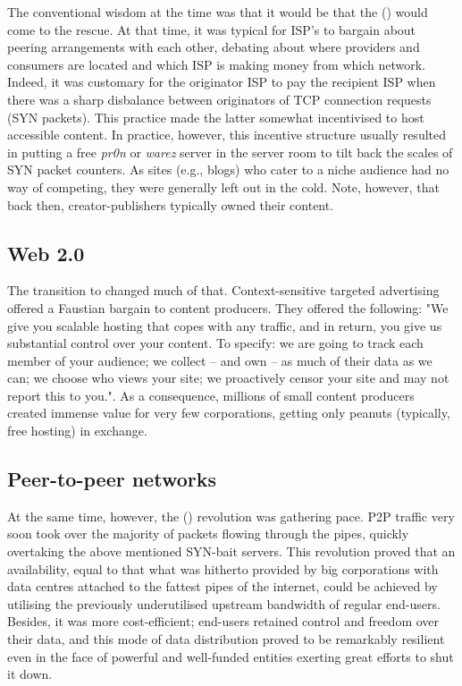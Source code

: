 The conventional wisdom at the time was that it would be that the  () would come to the rescue. At that time, it was typical for ISP's to bargain about peering arrangements with each other, debating about where providers and consumers are located and which ISP is making money from which network. Indeed, it was customary for the originator ISP to pay the recipient ISP when there was a sharp disbalance between originators of TCP connection requests (SYN packets). This practice made the latter somewhat incentivised to host accessible content. In practice, however, this incentive structure usually resulted in putting a free \emph{pr0n} or \emph{warez} server in the server room to tilt back the scales of SYN packet counters. As sites (e.g., blogs) who cater to a niche audience had no way of competing, they were generally left out in the cold. Note, however, that back then, creator-publishers typically owned their content.

\subsection{Web 2.0}\label{sec:web_2}

The transition to  changed much of that. Context-sensitive targeted advertising offered a Faustian bargain to content producers. They offered the following:
"We give you scalable hosting that copes with any traffic, and in return, you give us substantial control over your content. To specify: we are going to track each member of your audience; we collect -- and own -- as much of their data as we can; we choose who views your site; we proactively censor your site and may not report this to you.". As a consequence, millions of small content producers created immense value for very few corporations, getting only peanuts (typically, free hosting) in exchange.

\subsection{Peer-to-peer networks}\label{sec:peer_to_peer}

At the same time, however, the  () revolution was gathering pace. P2P traffic very soon took over the majority of packets flowing through the pipes, quickly overtaking the above mentioned SYN-bait servers. This revolution proved that an availability, equal to that what was hitherto provided by big corporations with data centres attached to the fattest pipes of the internet, could be achieved by utilising the previously underutilised upstream bandwidth of regular end-users. Besides, it was more cost-efficient; end-users retained control and freedom over their data, and this mode of data distribution proved to be remarkably resilient even in the face of powerful and well-funded entities exerting great efforts to shut it down.

